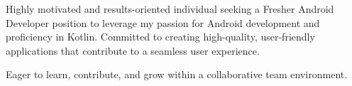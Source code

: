 \begin{cvparagraph}

Highly motivated and results-oriented individual seeking a Fresher Android Developer position to leverage my passion for Android development and proficiency in Kotlin. Committed to creating high-quality, user-friendly applications that contribute to a seamless user experience.


Eager to learn, contribute, and grow within a collaborative team environment.

\end{cvparagraph}

